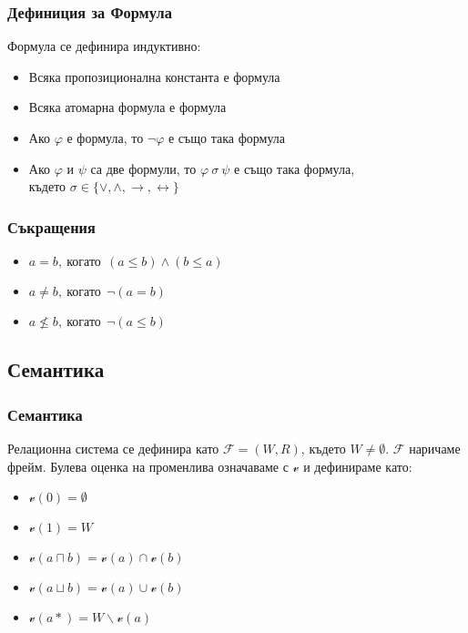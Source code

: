 \documentclass{beamer}
\begin{document}
\begin{frame}\frametitle{Дефиниция за Формула}
Формула се дефинира индуктивно:
		\begin{itemize}
			\item Всяка пропозиционална константа е формула
			\item Всяка атомарна формула е формула
			\item Ако $\varphi$ е формула, то $\neg{\varphi}$ е също така формула
			\item Ако $\varphi$ и $\psi$ са две формули, то $\varphi \: \sigma \: \psi $ е също така формула,\\
				където $\sigma \in \{\vee, \wedge, \rightarrow, \leftrightarrow\}$
		\end{itemize}
\end{frame}

\begin{frame}\frametitle{Съкращения}
		\begin{itemize}
		\item $a = b,\:\textit{когато}\:\: (a \le b) \land (b \le a)$
		\item $a \neq b,\:\textit{когато}\:\: \neg (a = b) $
		\item $a \nleq b,\:\textit{когато}\:\: \neg (a \le b)$
		\end{itemize}
\end{frame}

\subsection{Семантика}
\begin{frame}\frametitle{Семантика}
	Релационна система се дефинира като $\mathcal{F} = (W, R)$, където $W \neq \emptyset$. $\mathcal{F}$ наричаме фрейм.
	\newline
	\newline
	Булева оценка на променлива означаваме с  $\mathscr{v}$ и дефинираме като:
		\begin{itemize}
			\item $\mathscr{v}(0) = \emptyset$
			\item $\mathscr{v}(1) = W$
			\item $\mathscr{v}(a \sqcap b) = \mathscr{v}(a) \cap \mathscr{v}(b)$
			\item $\mathscr{v}(a \sqcup b) = \mathscr{v}(a) \cup \mathscr{v}(b)$
			\item $\mathscr{v}(a*) = W \backslash  \mathscr{v}(a)$
		\end{itemize}
	
\end{frame}
\end{document}
